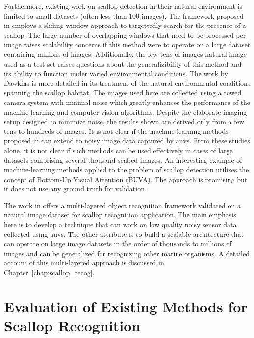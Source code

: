\documentclass {udthesis}
\begin{document}
Furthermore,  existing work on scallop detection \cite{dawkings13, guomundsson} in their natural
environment is limited to small datasets (often less than 100 images). 
The framework proposed in \cite{guomundsson} employs a sliding window approach to targettedly search for the presence of a scallop. The large number of overlapping windows that need to be processed per image raises scalability concerns if this method were to operate 
on a large dataset containing millions of images. Additionally, the few tens of images natural image used as a test set raises questions about the generalizibility of this method and its ability to function under varied environmental conditions.
The work by Dawkins \cite{dawkings13} is more detailed in its treatment of the natural environmental conditions spanning the scallop habitat. The images used here are collected using a towed camera system with minimal noise which greatly enhances the performance of the machine learning and computer vision algorithms. Despite the elaborate imaging setup designed to minimize noise, the results shown are derived only from a few tens to hundreds of images.
It is not clear if the machine learning methods proposed in \cite{dawkings13} can extend to noisy image data captured by \gls{auv}s.
From these studies alone, it is not clear if such methods can be used effectively
in cases of large datasets comprising several thousand seabed images.
An interesting example of machine-learning methods applied to the
problem of scallop detection \cite{fearn} 
utilizes the concept of Bottom-Up Visual Attention (BUVA).
The approach is promising but it does not use any ground truth for validation.  

The work in \cite{prasanna_med, prasanna_aslo, prasanna_igi} offers a multi-layered object recognition framework validated on
a natural image dataset for scallop recognition application. 
The main emphasis here is to develop a technique that can work on low quality noisy sensor data collected using \gls{auv}s.
The other attribute is to build a scalable architecture that can operate on 
large image datasets in the order of thousands to millions of images
and can be generalized for recognizing other marine organisms.
A detailed account of this multi-layered approach is discussed in Chapter~\ref{chap:scallop_recog}.


\section{Evaluation of Existing Methods for Scallop Recognition}
\end{document}
